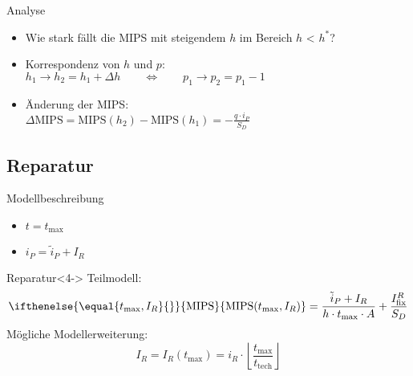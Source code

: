 \documentclass[beamer, xcolor=table]{beamer}
\newcommand{\MIPS}[1][]{
  \ifthenelse {\equal {#1} {}}
  {\text{MIPS}} %
  {\text{MIPS}({#1})} %
}
\newcommand{\I}[1]{I_\text{#1}}
\renewcommand{\t}[1]{t_\text{#1}}
\begin{document}
	\begin{frame}{Analyse}		
		\begin{itemize}
			\item<1-> Wie stark fällt die MIPS mit steigendem $h$ im Bereich $h$ < $h^*$?
			\item<2-> Korrespondenz von $h$ und $p$: \\ $h_1 \rightarrow h_2 = h_1 + \Delta h \qquad \Leftrightarrow \qquad p_1 \rightarrow p_2 = p_1 -1$
			\item<3-> Änderung der MIPS: \\ $\Delta \text{MIPS} = \text{MIPS}(h_2) - \text{MIPS}(h_1) = - \frac{q \cdot i_P}{S_D}$
		\end{itemize}
		\begin{center}
			\resizebox{0.5\linewidth}{!}{
				
			}
		\end{center}
	\end{frame}

\subsection{Reparatur}
\frame{\subsectionpage}
	\begin{frame}{Modellbeschreibung}
        \begin{itemize}
            \item<1-> $t = \t{max}$
            \item<2-> $i_P = \tilde{i}_P + I_R$
        \end{itemize}
		\begin{center}
            \begin{block}{Reparatur}<4->
                Teilmodell:
                \begin{equation*}
                    \MIPS[\t{max}, I_R] = \frac{\tilde{i}_P + I_R}{h\cdot \t{max}\cdot A} 
                    + \frac{\I{fix}^R}{S_D}
                \end{equation*}
                Mögliche Modellerweiterung:
                \begin{equation*}
                    I_R = I_R(\t{max}) = i_R \cdot
                    \left\lfloor\frac{\t{max}}{\t{tech}}\right\rfloor
                \end{equation*}
            \end{block}
		\end{center}
	\end{frame}
\end{document}
